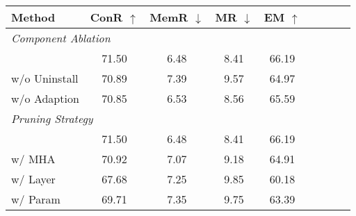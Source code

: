 

    \small
    \begin{tabular}{l | c c c c c c c c}
        \hline
        \textbf{Method} & \textbf{ConR} $\uparrow$ & \textbf{MemR} $\downarrow$ & \textbf{MR} $\downarrow$ & \textbf{EM} $\uparrow$   \\
        \hline
            \multicolumn{5}{l}{{\cellcolor[rgb]{0.957,0.957,0.957}}\textit{Component Ablation}} \\
            \hline
        \method{} & 71.50 & 6.48 & 8.41 & 66.19  \\
         w/o Uninstall &  70.89 & 7.39 & 9.57 & 64.97  \\
         w/o Adaption & 70.85 & 6.53 & 8.56 & 65.59 \\
        \hline
        \multicolumn{5}{l}{{\cellcolor[rgb]{0.957,0.957,0.957}}\textit{Pruning Strategy}} \\
        \hline
        \method{} &  71.50 & 6.48 & 8.41 & 66.19 \\
        w/ MHA  &  70.92 & 7.07 & 9.18 & 64.91 \\
        w/ Layer & 67.68 & 7.25 & 9.85 & 60.18 \\
        w/ Param &  69.71 & 7.35 & 9.75 & 63.39 \\
        \hline
        
        
    \end{tabular}
    

